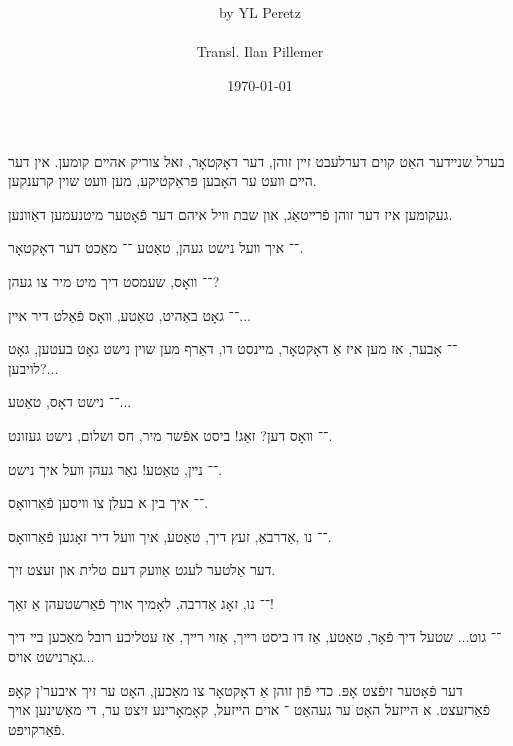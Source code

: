 \documentclass{article}
\begin{document}
\renewcommand{\abstractname}{\vspace{-\baselineskip}}
\title{
}
\author{by YL Peretz \\ \\ Transl. Ilan Pillemer}

\date{\today}

\maketitle
\abstract{}
\vspace*{-85em}
\begin{pairs}

\begin{Rightside}
\begin{RTL}
\begin{hebrew}
\beginnumbering
\autopar

בערל שנײדער האַט קוים דערלעבט זײן זוהן, דער דאָקטאָר,
זאל צוריק אהײם קומען. אין דער הײם װעט ער האָבען פּראַקטיקע,
מען װעט שוין קרענקען.

געקומען איז דער זוהן פֿרײטאַג, און שבת װיל איהם דער פֿאָטער מיטנעמען דאַװנען.

־־ איך װעל נישט געהן, טאַטע ־־  מאַכט דער דאָקטאָר.
  
 ־־ װאָס, שעמסט דיך מיט מיר צו געהן?

־־ גאָט באַהיט, טאַטע, װאָס פֿאַלט דיר אײן...

־־ אָבער, אז מען איז אַ דאָקטאָר, מײנסט דו, דאַרף מען שוין נישט גאָט בעטען, גאָט לויבען?...

־־ נישט דאָס, טאַטע...

־־ װאָס דען? זאַג! ביסט אפֿשר מיר, חס ושלום, נישט געזונט.

־־ נײן, טאַטע! נאַר געהן װעל איך נישט.

 ־־ איך בין א בעלן צו װיסען פֿאַרװאָס.

־־ נו ,אַדרבאַ, זעץ דיך, טאַטע, איך װעל דיר זאָגען פֿאַרװאָס.

דער אַלטער לעגט אַװעק דעם טלית און זעצט זיך.

־־ נו, זאָג אַדרבה, לאָמיך אויך פֿאַרשטעהן אַ זאַך!

־־ גוט... שטעל דיך פֿאָר, טאַטע, אַז דו ביסט רײך, אַזוי 
רײך, אַז עטליכע רובל מאַכען בײ דיך גאָרנישט אויס...

דער פֿאָטער זיפֿצט אָפּ. כדי פֿון זוהן אַ דאָקטאָר צו מאַכען,
האָט ער זיך איבער'ן קאָפּ פֿאַרזעצט. א הײזעל האָט ער געהאַט ־
אוים הײזעל, קאָמאָרינע זיצט ער, די מאַשינען אויך פֿאַרקויפט.


\end{hebrew}
\end{RTL}
\end{Rightside}
\end{pairs}
\end{document}
